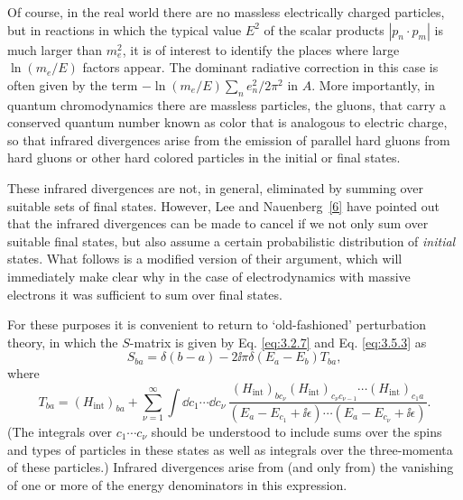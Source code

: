 Of course, in the real world there are no massless electrically charged
particles, but in reactions in which the typical value $E^2$ of the scalar
products $|p_n\cdot p_m|$ is much larger than $m_e^2$, it is of interest to
identify the places where large $\ln(m_e/E)$ factors appear. The dominant
radiative correction in this case is often given by the term
$-\ln(m_e/E)\sum_n e_n^2/2\pi^2$ in $A$. More importantly, in quantum
chromodynamics there are massless particles, the gluons, that carry a
conserved quantum number known as color that is analogous to electric charge,
so that infrared divergences arise from the emission of parallel hard gluons
from hard gluons or other hard colored particles in the initial or final
states.

These infrared divergences are not, in general, eliminated by summing over
suitable sets of final states. However, Lee and
Nauenberg~\hyperref[ref:13.6]{[6]} have pointed out that the infrared
divergences can be made to cancel if we not only sum over suitable final
states, but also assume a certain probabilistic distribution of \emph{initial}
states. What follows is a modified version of their argument, which will
immediately make clear why in the case of electrodynamics with massive
electrons it was sufficient to sum over final states.

For these purposes it is convenient to return to `old-fashioned' perturbation
theory, in which the $S$-matrix is given by Eq. \eqref{eq:3.2.7} and
Eq. \eqref{eq:3.5.3} as
\begin{equation}
S_{ba}=\delta(b-a)-2\ii\pi\delta(E_a-E_b)T_{ba},
\tag{13.4.1}\label{eq:13.4.1}
\end{equation}
where
\begin{equation}
T_{ba}=(H_{\mathrm{int}})_{ba}
+\sum_{\nu=1}^{\infty}\int \dd c_1\cdots \dd c_\nu\,
\frac{(H_{\mathrm{int}})_{bc_\nu}
(H_{\mathrm{int}})_{c_\nu c_{\nu-1}}\cdots
(H_{\mathrm{int}})_{c_1a}}
{(E_a-E_{c_1}+\ii\epsilon)\cdots(E_a-E_{c_\nu}+\ii\epsilon)}.
\tag{13.4.2}\label{eq:13.4.2}
\end{equation}
(The integrals over $c_1\cdots c_\nu$ should be understood to include sums
over the spins and types of particles in these states as well as integrals
over the three-momenta of these particles.) Infrared divergences arise from
(and only from) the vanishing of one or more of the energy denominators in
this expression.

